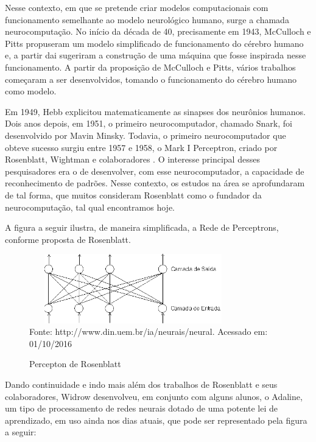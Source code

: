 Nesse contexto, em que se pretende criar modelos computacionais com funcionamento semelhante ao modelo neurológico humano, surge a chamada neurocomputação. 
No início da década de 40, precisamente em 1943, McCulloch e Pitts \cite{Heaton2008} propuseram um modelo simplificado de funcionamento do cérebro humano e, 
a partir dai sugeriram a construção de uma máquina que fosse inspirada nesse funcionamento. A partir da proposição de McCulloch e Pitts, vários trabalhos começaram a ser desenvolvidos, tomando o funcionamento do cérebro humano como modelo. 

Em 1949, Hebb explicitou matematicamente as sinapses dos neurônios humanos. Dois anos depois, em 1951, o primeiro neurocomputador, 
chamado Snark, foi desenvolvido por Mavin Minsky. Todavia, o primeiro neurocomputador que obteve sucesso surgiu entre 1957 e 1958, 
o Mark I Perceptron, criado por Rosenblatt, Wightman e colaboradores \cite{Heaton2008}. O interesse principal desses pesquisadores era o de desenvolver, com esse neurocomputador, a capacidade de reconhecimento de padrões. Nesse contexto, os estudos na área se aprofundaram de tal forma, que muitos consideram Rosenblatt como o fundador da neurocomputação, tal qual encontramos hoje. 

\vspace{5mm}
A figura a seguir ilustra, de maneira simplificada, a Rede de Perceptrons, conforme proposta de Rosenblatt.

\begin{figure}[!ht]
\centering
\caption{Percepton de Rosenblatt}
\vspace{1mm}
\includegraphics[width=90mm, height=30mm]{Figuras/Neural/Rosenblatt.png}\\
\tiny Fonte: http://www.din.uem.br/ia/neurais/neural. Acessado em: 01/10/2016
\end{figure}

\pagebreak

Dando continuidade e indo mais além dos trabalhos de Rosenblatt e seus colaboradores, Widrow desenvolveu, em conjunto com alguns 
alunos, o Adaline, um tipo de processamento de redes neurais dotado de uma potente lei de aprendizado, em uso ainda nos dias atuais, 
que pode ser representado pela figura a seguir:

